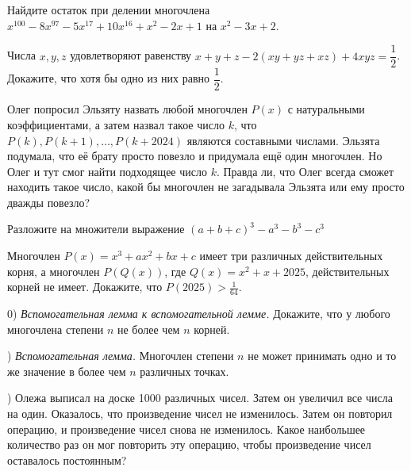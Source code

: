 Найдите остаток при делении многочлена $x^{100}-8 x^{97}-5 x^{17}+10 x^{16}+x^2-2 x+1$ на $x^2-3 x+2$.

Числа $x, y, z$ удовлетворяют равенству $x+y+z-2(x y+y z+x z)+4 x y z= \dfrac{1}{2}$. Докажите, что хотя бы одно из них равно $\dfrac{1}{2}$.

Олег попросил Эльзяту назвать любой многочлен $P(x)$ с натуральными коэффициентами, а затем назвал такое число $k$, что $P(k), P(k+1), \ldots, P(k+2024)$ являются составными числами. Эльзята подумала, что её брату просто повезло и придумала ещё один многочлен. Но Олег и тут смог найти подходящее число $k$. Правда ли, что Олег всегда сможет находить такое число, какой бы многочлен не загадывала Эльзята или ему просто дважды повезло?

Разложите на множители выражение $(a + b + c)^3 - a^3 - b^3 - c^3$


Многочлен $P(x)=x^3+a x^2+b x+c$ имеет три различных действительных корня, а многочлен $P(Q(x))$, где $Q(x)=x^2+x+2025$, действительных корней не имеет. Докажите, что $P(2025)>\frac{1}{64}$.

0) \textit{Вспомогательная лемма к вспомогательной лемме.} Докажите, что у любого многочлена степени $n$ не более чем $n$ корней.

) \textit{Вспомогательная лемма.} Многочлен степени $n$ не может принимать одно и то же значение в более чем $n$ различных точках.

) Олежа выписал на доске 1000 различных чисел. Затем он увеличил все числа на один. Оказалось, что произведение чисел не изменилось. Затем он повторил операцию, и произведение чисел снова не изменилось. Какое наибольшее количество раз он мог повторить эту операцию, чтобы произведение чисел оставалось постоянным?